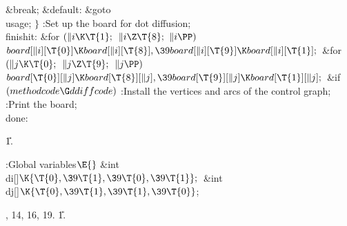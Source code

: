 \&{break};\6
\4\&{default}:\5
\&{goto} \\{usage};\6
\4${}\}{}$\2\6
:Set up the board for dot diffusion\X;\6
\4\\{finishit}:\6
\&{for} ${}(\|i\K\T{1};{}$ ${}\|i\Z\T{8};{}$ ${}\|i\PP){}$\1\5
${}\\{board}[\|i][\T{0}]\K\\{board}[\|i][\T{8}],\39\\{board}[\|i][\T{9}]\K%
\\{board}[\|i][\T{1}];{}$\2\6
\&{for} ${}(\|j\K\T{0};{}$ ${}\|j\Z\T{9};{}$ ${}\|j\PP){}$\1\5
${}\\{board}[\T{0}][\|j]\K\\{board}[\T{8}][\|j],\39\\{board}[\T{9}][\|j]\K%
\\{board}[\T{1}][\|j];{}$\2\6
\&{if} ${}(\\{methodcode}\G\\{ddiffcode}){}$\1\5
:Install the vertices and arcs of the control graph\X;\2\6
:Print the board\X;\6
\\{done}:\par
\U1.\fi

\B{}:Global variables\X${}\E{}$\6
\&{int} \\{di}[]${}\K\{\T{0},\39\T{1},\39\T{0},\39\T{1}\};{}$\6
\&{int} \\{dj}[]${}\K\{\T{0},\39\T{1},\39\T{1},\39\T{0}\}{}$;\par
{}, 14, 16, 19.
\U1.\fi

